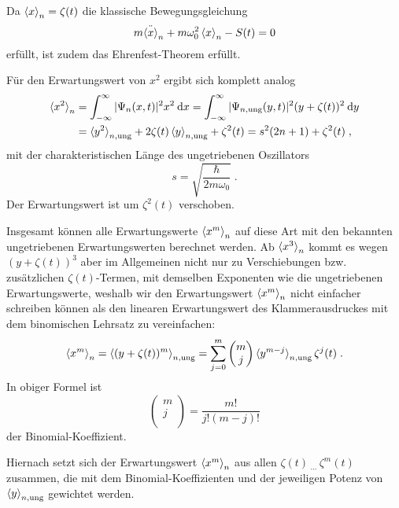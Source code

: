     Da $\braket{x}_n=\zeta(t)$ die klassische Bewegungsgleichung
    \begin{equation}
      m\ddot{\braket{x}}_n + m\omega_0^2\braket{x}_n - S(t) = 0
    \end{equation}
    erfüllt, ist zudem das Ehrenfest-Theorem erfüllt.

    Für den Erwartungswert von $x^2$ ergibt sich komplett analog
    \begin{align}
      \braket{x^2}_n &= \int_{-\infty}^{\infty} |\Psi_n(x,t)|^2 x^2 \: \text dx
      = \int_{-\infty}^{\infty} |\Psi_{n,\text{ung}}(y,t)|^2 (y+\zeta(t))^2 \: \text dy \notag \\
      &= \braket{y^2}_{n,\text{ung}} + 2\zeta(t)\braket{y}_{n,\text{ung}} + \zeta^2(t)
      = s^2(2n+1) + \zeta^2(t) \; ,
      \label{erwartungswert_x^2_einzelner}
    \end{align}
    mit der charakteristischen Länge des ungetriebenen Oszillators
    \begin{equation}
      s = \sqrt{\frac{\hbar}{2m\omega_0}} \; .
      \label{charak_laenge}
    \end{equation}
    Der Erwartungswert ist um $\zeta^2(t)$ verschoben.

    Insgesamt können alle Erwartungswerte $\braket{x^m}_n$ auf diese Art mit den bekannten ungetriebenen Erwartungswerten berechnet werden.
    Ab $\braket{x^3}_n$ kommt es wegen $(y+\zeta(t))^3$ aber im Allgemeinen nicht nur zu Verschiebungen bzw. zusätzlichen $\zeta(t)$-Termen, mit demselben Exponenten wie die ungetriebenen Erwartungswerte, weshalb wir den Erwartungswert $\braket{x^m}_n$ nicht einfacher schreiben können als den linearen Erwartungswert des Klammerausdruckes mit dem binomischen Lehrsatz zu vereinfachen:
    \begin{equation}
      \braket{x^m}_n = \braket{(y+\zeta(t))^m}_{n,\text{ung}} = \sum_{j=0}^m \begin{pmatrix} m \\ j \\ \end{pmatrix} \braket{y^{m-j}}_{n,\text{ung}}\zeta^j(t) \; .
      \label{erwartungswert_x^m_einzelner}
    \end{equation}
    In obiger Formel ist
    \begin{equation}
      \begin{pmatrix} m \\ j \\ \end{pmatrix} = \frac{m!}{j!(m-j)!}
    \end{equation}
    der Binomial-Koeffizient.
\iffalse
\begin{equation}
  \braket{x^m}_n = \braket{(y+\zeta(t))^m}_{n,\text{ung}} = \sum_{j=0}^m \frac{m!}{j!(m-j)!} \braket{y^{m-j}}_{n,\text{ung}}\zeta^j(t) \; .
  \label{erwartungswert_x^m_einzelner}
\end{equation}
\fi
    Hiernach setzt sich der Erwartungswert $\braket{x^m}_n$ aus allen $\zeta(t)\,_{...}\,\zeta^m(t)$ zusammen, die mit dem Binomial-Koeffizienten und der jeweiligen Potenz von $\braket{y}_{n,\text{ung}}$ gewichtet werden.


